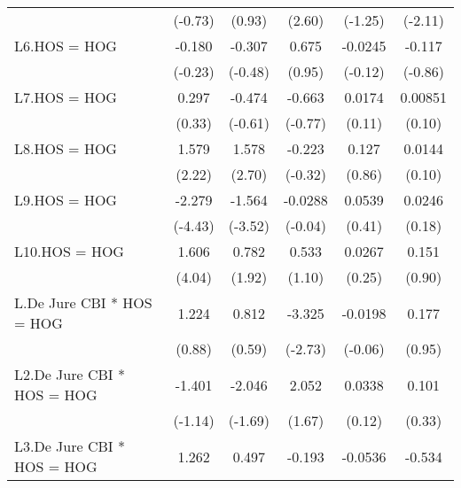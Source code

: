 {\begin{longtable}{l*{5}{c}}
                &  (-0.73)         &   (0.93)         &   (2.60)         &  (-1.25)         &  (-2.11)         \\
\addlinespace
L6.HOS = HOG    &   -0.180         &   -0.307         &    0.675         &  -0.0245         &   -0.117         \\
                &  (-0.23)         &  (-0.48)         &   (0.95)         &  (-0.12)         &  (-0.86)         \\
\addlinespace
L7.HOS = HOG    &    0.297         &   -0.474         &   -0.663         &   0.0174         &  0.00851         \\
                &   (0.33)         &  (-0.61)         &  (-0.77)         &   (0.11)         &   (0.10)         \\
\addlinespace
L8.HOS = HOG    &    1.579\sym{*}  &    1.578\sym{**} &   -0.223         &    0.127         &   0.0144         \\
                &   (2.22)         &   (2.70)         &  (-0.32)         &   (0.86)         &   (0.10)         \\
\addlinespace
L9.HOS = HOG    &   -2.279\sym{***}&   -1.564\sym{***}&  -0.0288         &   0.0539         &   0.0246         \\
                &  (-4.43)         &  (-3.52)         &  (-0.04)         &   (0.41)         &   (0.18)         \\
\addlinespace
L10.HOS = HOG   &    1.606\sym{***}&    0.782         &    0.533         &   0.0267         &    0.151         \\
                &   (4.04)         &   (1.92)         &   (1.10)         &   (0.25)         &   (0.90)         \\
\addlinespace
L.De Jure CBI * HOS = HOG&    1.224         &    0.812         &   -3.325\sym{**} &  -0.0198         &    0.177         \\
                &   (0.88)         &   (0.59)         &  (-2.73)         &  (-0.06)         &   (0.95)         \\
\addlinespace
L2.De Jure CBI * HOS = HOG&   -1.401         &   -2.046         &    2.052         &   0.0338         &    0.101         \\
                &  (-1.14)         &  (-1.69)         &   (1.67)         &   (0.12)         &   (0.33)         \\
\addlinespace
L3.De Jure CBI * HOS = HOG&    1.262         &    0.497         &   -0.193         &  -0.0536         &   -0.534\sym{*}  \\

\end{longtable}}
